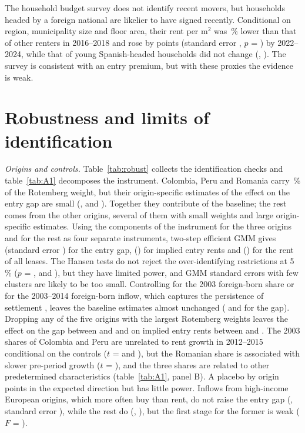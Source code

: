 \documentclass[11pt,a4paper]{article}
\begin{document}
The household budget survey does not identify recent movers, but households headed by a foreign national are likelier to have signed recently. Conditional on region, municipality size and floor area, their rent per m$^2$ was \epfFpremAbs\,\% lower than that of other renters in 2016--2018 and rose by \epfFchg{} points (standard error \epfFchgSe, $p$ = \epfFchgP) by 2022--2024, while that of young Spanish-headed households did not change (\epfYchg, \epfYchgSe). The survey is consistent with an entry premium, but with these proxies the evidence is weak.



\section{Robustness and limits of identification}\label{sec:robust}

\textit{Origins and controls.} Table~\ref{tab:robust} collects the identification checks and table~\ref{tab:A1} decomposes the instrument. Colombia, Peru and Romania carry \rotTop\,\% of the Rotemberg weight, but their origin-specific estimates of the effect on the entry gap are small (\oneColGap, \onePerGap{} and \oneRomGap). Together they contribute \rotTopContr{} of the \bGap{} baseline; the rest comes from the other origins, several of them with small weights and large origin-specific estimates. Using the components of the instrument for the three origins and for the rest as four separate instruments, two-step efficient GMM gives \gmmGap{} (standard error \gmmGapSe) for the entry gap, \gmmEntry{} (\gmmEntrySe) for implied entry rents and \gmmStock{} (\gmmStockSe) for the rent of all leases. The Hansen tests do not reject the over-identifying restrictions at 5\,\% ($p$ = \gmmGapJp, \gmmEntryJp{} and \gmmStockJp), but they have limited power, and GMM standard errors with few clusters are likely to be too small. Controlling for the 2003 foreign-born share \citep{borusyak2022} or for the 2003--2014 foreign-born inflow, which captures the persistence of settlement \citep{jaeger2018}, leaves the baseline estimates almost unchanged (\ssGap{} \ssGapAR{} and \rJrGap{} \rJrGapAR{} for the gap). Dropping any of the five origins with the largest Rotemberg weights leaves the effect on the gap between \looMin{} and \looMax{} and on implied entry rents between \looEntryMin{} and \looEntryMax. The 2003 shares of Colombia and Peru are unrelated to rent growth in 2012--2015 conditional on the controls ($t$ = \balColPre{} and \balPerPre), but the Romanian share is associated with slower pre-period growth ($t$ = \balRomPre), and the three shares are related to other predetermined characteristics (table~\ref{tab:A1}, panel B). A placebo by origin points in the expected direction but has little power. Inflows from high-income European origins, which more often buy than rent, do not raise the entry gap (\plRich, standard error \plRichSe), while the rest do (\plOth, \plOthSe), but the first stage for the former is weak ($F$ = \plRichF).
\end{document}
